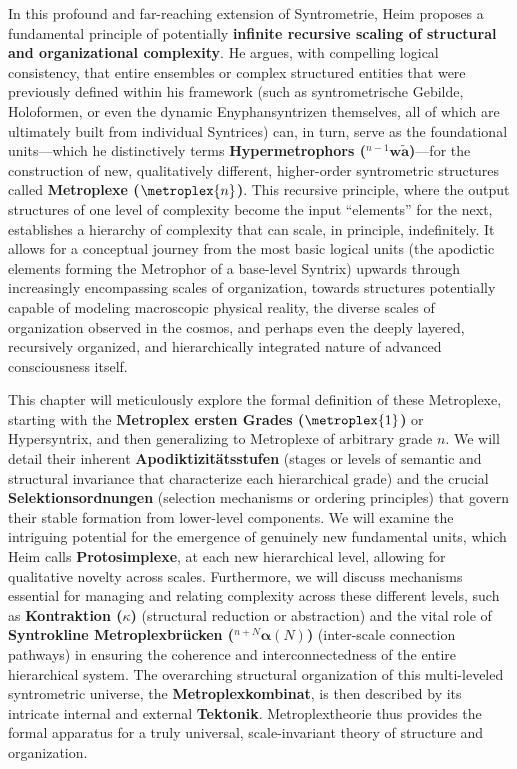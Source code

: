 \documentclass[
    12pt,              %
    a4paper,           %
    headings=normal,   %
    twoside=true,      %
    BCOR=8mm,          %
]{scrbook}
\newcommand{\q}[1]{\enquote{#1}}
\newcommand{\hypersyntrix}{\metroplex{1}}
\newcommand{\hypermetrophor}[1]{{}^{#1}\mathbf{w\widetilde{a}}}
\newcommand{\syntroklinebruecke}[1]{{}^{#1}\bm{\alpha}}
\begin{document}
In this profound and far-reaching extension of Syntrometrie, Heim proposes a fundamental principle of potentially \textbf{infinite recursive scaling of structural and organizational complexity}. He argues, with compelling logical consistency, that entire ensembles or complex structured entities that were previously defined within his framework (such as syntrometrische Gebilde, Holoformen, or even the dynamic Enyphansyntrizen themselves, all of which are ultimately built from individual Syntrices) can, in turn, serve as the foundational units—which he distinctively terms \textbf{Hypermetrophors (\(\hypermetrophor{n-1}\))}—for the construction of new, qualitatively different, higher-order syntrometric structures called \textbf{Metroplexe (\(\metroplex{n}\))}. This recursive principle, where the output structures of one level of complexity become the input \q{elements} for the next, establishes a hierarchy of complexity that can scale, in principle, indefinitely. It allows for a conceptual journey from the most basic logical units (the apodictic elements forming the Metrophor of a base-level Syntrix) upwards through increasingly encompassing scales of organization, towards structures potentially capable of modeling macroscopic physical reality, the diverse scales of organization observed in the cosmos, and perhaps even the deeply layered, recursively organized, and hierarchically integrated nature of advanced consciousness itself.

This chapter will meticulously explore the formal definition of these Metroplexe, starting with the \textbf{Metroplex ersten Grades (\(\hypersyntrix\))} or Hypersyntrix, and then generalizing to Metroplexe of arbitrary grade \(n\). We will detail their inherent \textbf{Apodiktizitätsstufen} (stages or levels of semantic and structural invariance that characterize each hierarchical grade) and the crucial \textbf{Selektionsordnungen} (selection mechanisms or ordering principles) that govern their stable formation from lower-level components. We will examine the intriguing potential for the emergence of genuinely new fundamental units, which Heim calls \textbf{Protosimplexe}, at each new hierarchical level, allowing for qualitative novelty across scales. Furthermore, we will discuss mechanisms essential for managing and relating complexity across these different levels, such as \textbf{Kontraktion (\(\kappa\))} (structural reduction or abstraction) and the vital role of \textbf{Syntrokline Metroplexbrücken (\(\syntroklinebruecke{n+N}(N)\))} (inter-scale connection pathways) in ensuring the coherence and interconnectedness of the entire hierarchical system. The overarching structural organization of this multi-leveled syntrometric universe, the \textbf{Metroplexkombinat}, is then described by its intricate internal and external \textbf{Tektonik}. Metroplextheorie thus provides the formal apparatus for a truly universal, scale-invariant theory of structure and organization.
\end{document}
